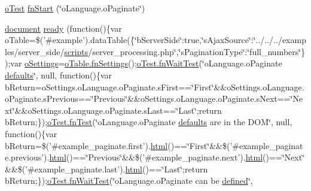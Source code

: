 \begin{DoxyCompactItemize}
\item 
\hyperlink{unit__test_8js_a3b2d259e2df3b6860d9047a92d09d0d6}{o\+Test} \hyperlink{4__server-side_2o_language_8o_paginate_8js_ad522a1b8c39e3d5c91f1d6630da631a9}{fn\+Start} (\char`\"{}o\+Language.\+o\+Paginate\char`\"{})
\item 
\hyperlink{outside_events_8js_aa14f8e0338cced6720590fd2ea13bd4b}{document} \hyperlink{4__server-side_2o_language_8o_paginate_8js_a4a12c6690f96bb8f65cfff27452ad23c}{ready} (function()\{var o\+Table=\$('\#example').data\+Table(\{\char`\"{}b\+Server\+Side\char`\"{}\+:true,\char`\"{}s\+Ajax\+Source\char`\"{}\+:\char`\"{}../../../examples/server\+\_\+side/\hyperlink{tinymce_8jquery_8dev_8js_a09066d4d580eeec222f858d588b4cdef}{scripts}/server\+\_\+processing.\+php\char`\"{},\char`\"{}s\+Pagination\+Type\char`\"{}\+:\char`\"{}full\+\_\+numbers\char`\"{}\});var \hyperlink{model_8settings_8js_a4857b9c813b4dea010668e9555d0aca7}{o\+Settings}=\hyperlink{api_8methods_8js_a78f387fab92a85c2cb7830bc5d8a6141}{o\+Table.\+fn\+Settings}();\hyperlink{onhold_24__server-side_2__zero__config_8js_ab25c4d596771c0133cdc45178ce72c3d}{o\+Test.\+fn\+Wait\+Test}(\char`\"{}o\+Language.\+o\+Paginate \hyperlink{model_8defaults_8js_a9114d742403a54e409eca2e2c78bff56}{defaults}\char`\"{}, null, function()\{var b\+Return=o\+Settings.\+o\+Language.\+o\+Paginate.\+s\+First==\char`\"{}First\char`\"{}\&\&o\+Settings.\+o\+Language.\+o\+Paginate.\+s\+Previous==\char`\"{}Previous\char`\"{}\&\&o\+Settings.\+o\+Language.\+o\+Paginate.\+s\+Next==\char`\"{}Next\char`\"{}\&\&o\+Settings.\+o\+Language.\+o\+Paginate.\+s\+Last==\char`\"{}Last\char`\"{};return b\+Return;\});\hyperlink{__zero__config__objects__subarrays_8js_a7f100cfe8617a03cd30c47b5e15396a4}{o\+Test.\+fn\+Test}(\char`\"{}o\+Language.\+o\+Paginate \hyperlink{model_8defaults_8js_a9114d742403a54e409eca2e2c78bff56}{defaults} are in the D\+O\+M\char`\"{}, null, function()\{var b\+Return=\$('\#example\+\_\+paginate.\+first').\hyperlink{tinymce_8jquery_8dev_8js_ac2090bcf2ff968c0083d5de53a6544f3}{html}()==\char`\"{}First\char`\"{}\&\&\$('\#example\+\_\+paginate.\+previous').\hyperlink{tinymce_8jquery_8dev_8js_ac2090bcf2ff968c0083d5de53a6544f3}{html}()==\char`\"{}Previous\char`\"{}\&\&\$('\#example\+\_\+paginate.\+next').\hyperlink{tinymce_8jquery_8dev_8js_ac2090bcf2ff968c0083d5de53a6544f3}{html}()==\char`\"{}Next\char`\"{}\&\&\$('\#example\+\_\+paginate.\+last').\hyperlink{tinymce_8jquery_8dev_8js_ac2090bcf2ff968c0083d5de53a6544f3}{html}()==\char`\"{}Last\char`\"{};return b\+Return;\});\hyperlink{onhold_24__server-side_2__zero__config_8js_ab25c4d596771c0133cdc45178ce72c3d}{o\+Test.\+fn\+Wait\+Test}(\char`\"{}o\+Language.\+o\+Paginate can be \hyperlink{tinymce_8js_a8cb6212cde9926d156ab5912c9b547cf}{defined}\char`\"{}, 
\end{DoxyCompactItemize}
